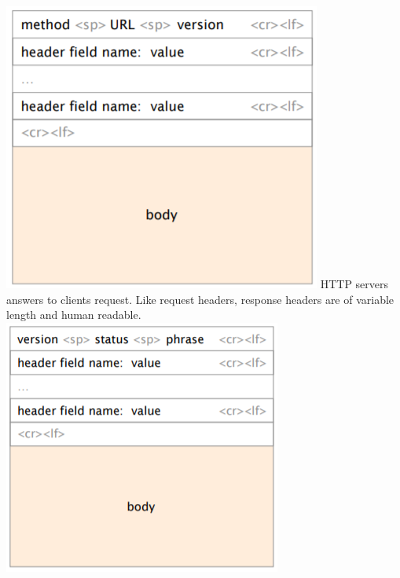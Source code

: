 \documentclass[a4paper, fontsize=8pt, landscape, DIV=1]{scrartcl}
\begin{document}
\begin{multicols*}{4}
		\includegraphics[width=\columnwidth]{images/Application_Layer/http_request.png}
		HTTP servers answers to clients request. Like request headers, response
		headers are of variable length and human readable.\\ 
		\includegraphics[width=\columnwidth]{images/Application_Layer/http_answer.png}
		\par 
		

\end{multicols*}
\end{document}
